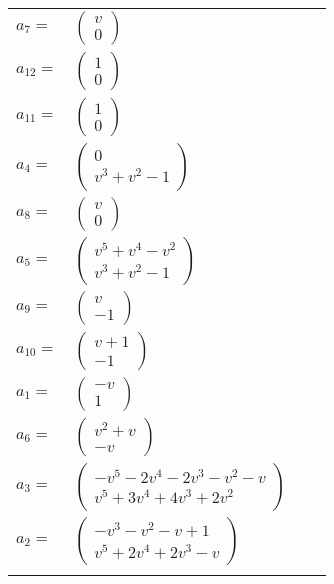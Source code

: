 \documentclass[1p]{elsarticle_modified}
\theoremstyle{definition}
\begin{document}
\begin{tabular}{m{7pt} m{180pt} m{7pt} m{180pt} }
\flushright $a_{7}=$&$\begin{pmatrix}v\\0\end{pmatrix}$ \\
\flushright $a_{12}=$&$\begin{pmatrix}1\\0\end{pmatrix}$ \\
\flushright $a_{11}=$&$\begin{pmatrix}1\\0\end{pmatrix}$ \\
\flushright $a_{4}=$&$\begin{pmatrix}0\\v^3+v^2-1\end{pmatrix}$ \\
\flushright $a_{8}=$&$\begin{pmatrix}v\\0\end{pmatrix}$ \\
\flushright $a_{5}=$&$\begin{pmatrix}v^5+v^4- v^2\\v^3+v^2-1\end{pmatrix}$ \\
\flushright $a_{9}=$&$\begin{pmatrix}v\\-1\end{pmatrix}$ \\
\flushright $a_{10}=$&$\begin{pmatrix}v+1\\-1\end{pmatrix}$ \\
\flushright $a_{1}=$&$\begin{pmatrix}- v\\1\end{pmatrix}$ \\
\flushright $a_{6}=$&$\begin{pmatrix}v^2+v\\- v\end{pmatrix}$ \\
\flushright $a_{3}=$&$\begin{pmatrix}- v^5-2 v^4-2 v^3- v^2- v\\v^5+3 v^4+4 v^3+2 v^2\end{pmatrix}$ \\
\flushright $a_{2}=$&$\begin{pmatrix}- v^3- v^2- v+1\\v^5+2 v^4+2 v^3- v\end{pmatrix}$\\&\end{tabular}
\end{document}
